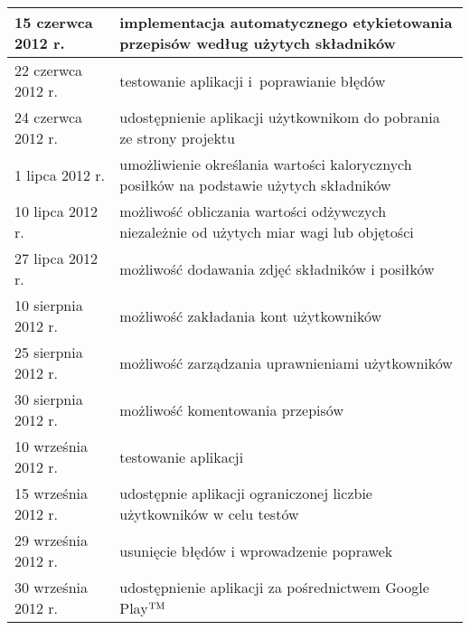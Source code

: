\documentclass[12pt,leqno, twoside]{mwart}
\def\tm{\leavevmode\hbox{$\rm {}^{TM}$}}
\begin{document}
\begin{table}
\begin{tabular}{|p{4cm}|p{11cm}|}
		15 czerwca 2012 r. & implementacja automatycznego etykietowania przepisów według użytych składników \\ \hline
		
		22 czerwca 2012 r. & testowanie aplikacji i~poprawianie błędów \\ \hline
		
		24 czerwca 2012 r. & udostępnienie aplikacji użytkownikom do pobrania ze strony projektu \\ \hline
		
		1 lipca 2012 r. & umożliwienie określania wartości kalorycznych posiłków na podstawie użytych składników \\ \hline

		10 lipca 2012 r. & możliwość obliczania wartości odżywczych niezależnie od użytych miar wagi lub objętości \\ \hline
		
		27 lipca 2012 r. & możliwość dodawania zdjęć składników i posiłków \\ \hline
		
		10 sierpnia 2012 r. & możliwość zakładania kont użytkowników \\ \hline
		
		25 sierpnia 2012 r. & możliwość zarządzania uprawnieniami użytkowników \\ \hline
		
		30 sierpnia 2012 r. & możliwość komentowania przepisów \\ \hline
		
		10 września 2012 r. & testowanie aplikacji \\ \hline
		
		15 września 2012 r. & udostępnie aplikacji ograniczonej liczbie użytkowników w celu testów \\ \hline
		
		29 września 2012 r. & usunięcie błędów i wprowadzenie poprawek \\ \hline
		
		30 września 2012 r. & udostępnienie aplikacji za pośrednictwem Google Play\tm \\ \hline
		
		
		\end{tabular}
\end{table}
\end{document}
